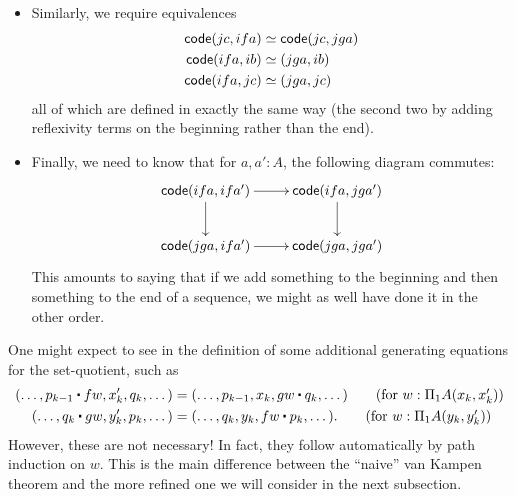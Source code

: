 \begin{itemize}
  We define this to consist of the two functions defined on sequences by
  \begin{align*}
    (\dots, y_n, p_n,fa) &\mapsto (\dots,y_n,p_n,a,\refl{ga},ga),\\
    (\dots, x_n, p_n, a, \refl{fa}, fa) &\mapsfrom (\dots, x_n, p_n, ga).
  \end{align*}
  Both of these functions are easily seen to respect the equivalence relations, and hence to define functions on the types of codes.
  The left-to-right-to-left composite is
  \[ (\dots, y_n, p_n,fa) \mapsto
  (\dots,y_n,p_n,a,\refl{ga},a,\refl{fa},fa)
  \]
  which is equal to the identity by a generating equality of the quotient.
  The other composite is analogous.
  Thus we have defined an equivalence~\eqref{eq:bfa-bga}.
\item Similarly, we require equivalences
  \begin{align*}
    \mathsf{code}(jc,ifa) &\simeq \mathsf{code}(jc,jga)\\
    \mathsf{code}(ifa,ib)&\simeq (jga,ib)\\
    \mathsf{code}(ifa,jc)&\simeq (jga,jc)
  \end{align*}
  all of which are defined in exactly the same way (the second two by adding reflexivity terms on the beginning rather than the end).
\item Finally, we need to know that for $a,a':A$, the following diagram commutes:
  \begin{equation}\label{eq:bfa-bga-comm}
  \vcenter{\xymatrix{
      \code(ifa,ifa') \ar[r]\ar[d] &
      \code(ifa,jga')\ar[d]\\
      \code(jga,ifa')\ar[r] &
      \code(jga,jga')
      }}
  \end{equation}
  This amounts to saying that if we add something to the beginning and then something to the end of a sequence, we might as well have done it in the other order.
\end{itemize}

\begin{rmk}\label{rmk:naive}
  One might expect to see in the definition of \code some additional generating equations for the set-quotient, such as
  \begin{align*}
    (\dots, p_{k-1} \ct fw, x_{k}', q_{k}, \dots) &=
    (\dots, p_{k-1}, x_{k}, gw \ct q_{k}, \dots)
    \tag{for $w:\Pi_1A(x_{k},x_{k}')$}\\
    (\dots, q_k \ct gw, y_k', p_k, \dots) &=
    (\dots, q_k, y_k, fw \ct p_k, \dots).
    \tag{for $w:\Pi_1A(y_k, y_k')$}
  \end{align*}
  However, these are not necessary!
  In fact, they follow automatically by path induction on $w$.
  This is the main difference between the ``naive'' van Kampen theorem and the more refined one we will consider in the next subsection.
\end{rmk}

